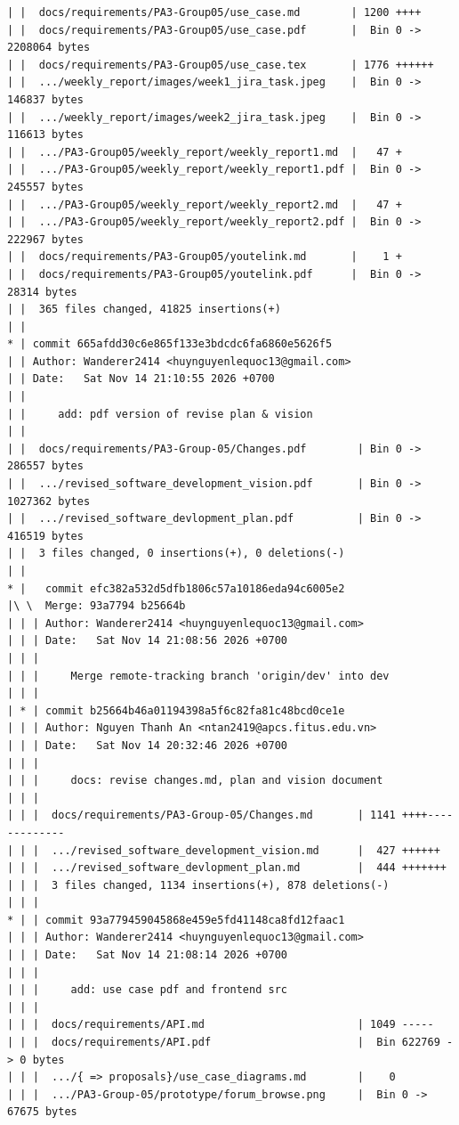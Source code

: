 \documentclass[12pt]{article}
\begin{document}
\begin{lstlisting}[numbers=none,breaklines=true]
| |  docs/requirements/PA3-Group05/use_case.md        | 1200 ++++
| |  docs/requirements/PA3-Group05/use_case.pdf       |  Bin 0 -> 2208064 bytes
| |  docs/requirements/PA3-Group05/use_case.tex       | 1776 ++++++
| |  .../weekly_report/images/week1_jira_task.jpeg    |  Bin 0 -> 146837 bytes
| |  .../weekly_report/images/week2_jira_task.jpeg    |  Bin 0 -> 116613 bytes
| |  .../PA3-Group05/weekly_report/weekly_report1.md  |   47 +
| |  .../PA3-Group05/weekly_report/weekly_report1.pdf |  Bin 0 -> 245557 bytes
| |  .../PA3-Group05/weekly_report/weekly_report2.md  |   47 +
| |  .../PA3-Group05/weekly_report/weekly_report2.pdf |  Bin 0 -> 222967 bytes
| |  docs/requirements/PA3-Group05/youtelink.md       |    1 +
| |  docs/requirements/PA3-Group05/youtelink.pdf      |  Bin 0 -> 28314 bytes
| |  365 files changed, 41825 insertions(+)
| |
* | commit 665afdd30c6e865f133e3bdcdc6fa6860e5626f5
| | Author: Wanderer2414 <huynguyenlequoc13@gmail.com>
| | Date:   Sat Nov 14 21:10:55 2026 +0700
| |
| |     add: pdf version of revise plan & vision
| |
| |  docs/requirements/PA3-Group-05/Changes.pdf        | Bin 0 -> 286557 bytes
| |  .../revised_software_development_vision.pdf       | Bin 0 -> 1027362 bytes
| |  .../revised_software_devlopment_plan.pdf          | Bin 0 -> 416519 bytes
| |  3 files changed, 0 insertions(+), 0 deletions(-)
| |
* |   commit efc382a532d5dfb1806c57a10186eda94c6005e2
|\ \  Merge: 93a7794 b25664b
| | | Author: Wanderer2414 <huynguyenlequoc13@gmail.com>
| | | Date:   Sat Nov 14 21:08:56 2026 +0700
| | |
| | |     Merge remote-tracking branch 'origin/dev' into dev
| | |
| * | commit b25664b46a01194398a5f6c82fa81c48bcd0ce1e
| | | Author: Nguyen Thanh An <ntan2419@apcs.fitus.edu.vn>
| | | Date:   Sat Nov 14 20:32:46 2026 +0700
| | |
| | |     docs: revise changes.md, plan and vision document
| | |
| | |  docs/requirements/PA3-Group-05/Changes.md       | 1141 ++++-------------
| | |  .../revised_software_development_vision.md      |  427 ++++++
| | |  .../revised_software_devlopment_plan.md         |  444 +++++++
| | |  3 files changed, 1134 insertions(+), 878 deletions(-)
| | |
* | | commit 93a779459045868e459e5fd41148ca8fd12faac1
| | | Author: Wanderer2414 <huynguyenlequoc13@gmail.com>
| | | Date:   Sat Nov 14 21:08:14 2026 +0700
| | |
| | |     add: use case pdf and frontend src
| | |
| | |  docs/requirements/API.md                        | 1049 -----
| | |  docs/requirements/API.pdf                       |  Bin 622769 -> 0 bytes
| | |  .../{ => proposals}/use_case_diagrams.md        |    0
| | |  .../PA3-Group-05/prototype/forum_browse.png     |  Bin 0 -> 67675 bytes

\end{lstlisting}
\end{document}
